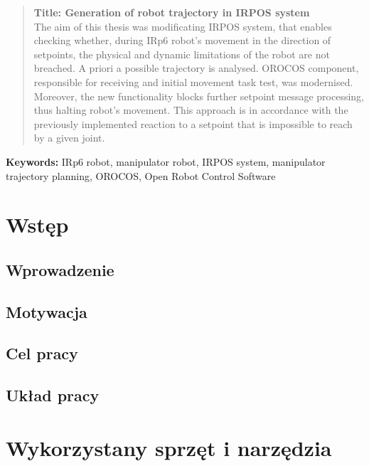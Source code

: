 \documentclass[11pt, a4paper, openright]{report}
\begin{document}
	\noindent\begin{minipage}{\linewidth}
		\renewcommand{\abstractname}{Abstract}
		\setlength{\parindent}{15pt}

		\begin{abstract}
			\textbf{Title: Generation of robot trajectory in IRPOS system}\\
			The aim of this thesis was modificating IRPOS system, that enables checking whether, during IRp6 robot's movement in the direction of setpoints, the physical and dynamic limitations of the robot are not breached. A priori a possible trajectory is analysed. OROCOS component, responsible for receiving and initial movement task test, was modernised.  Moreover, the new functionality blocks further setpoint message processing, thus halting robot's movement. This approach is in accordance with the previously implemented reaction to a setpoint that is impossible to reach by a given joint.
		\end{abstract}

		\textbf{Keywords:}
		IRp6 robot, manipulator robot, IRPOS system, manipulator trajectory planning, OROCOS, Open Robot Control Software 


	\end{minipage}
	\vfill


\tableofcontents{}
\pagebreak

\chapter{Wstęp}
\label{ch:wstep}
	\section{Wprowadzenie}
	\label{s:wprowadzenie}
	\section{Motywacja}
	\label{s:motywacja}
	\section{Cel pracy}
	\label{s:cel_pracy}
	\section{Układ pracy}
	\label{s:uklad_pracy}

\chapter{Wykorzystany sprzęt i narzędzia}
\label{ch:sprzęt_i_narzędzia}
\end{document}
